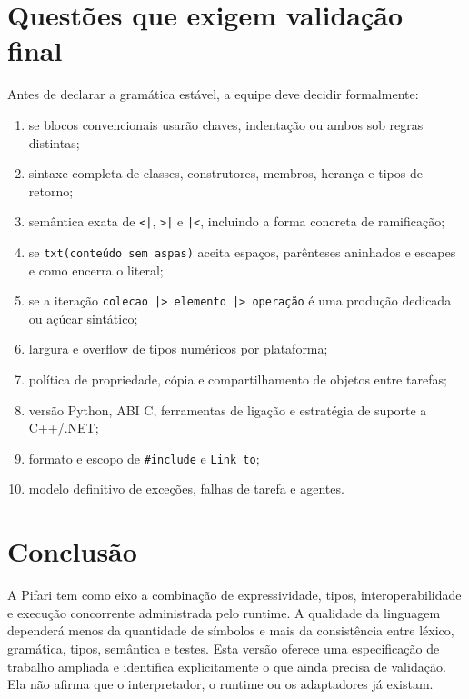 \documentclass[12pt,a4paper]{article}
\begin{document}
\section{Questões que exigem validação final}
Antes de declarar a gramática estável, a equipe deve decidir formalmente:
\begin{enumerate}
\item se blocos convencionais usarão chaves, indentação ou ambos sob regras distintas;
\item sintaxe completa de classes, construtores, membros, herança e tipos de retorno;
\item semântica exata de \texttt{<|}, \texttt{>|} e \texttt{|<}, incluindo a forma concreta de ramificação;
\item se \texttt{txt(conteúdo sem aspas)} aceita espaços, parênteses aninhados e escapes e como encerra o literal;
\item se a iteração \texttt{colecao |> elemento |> operação} é uma produção dedicada ou açúcar sintático;
\item largura e overflow de tipos numéricos por plataforma;
\item política de propriedade, cópia e compartilhamento de objetos entre tarefas;
\item versão Python, ABI C, ferramentas de ligação e estratégia de suporte a C++/.NET;
\item formato e escopo de \texttt{\#include} e \texttt{Link to};
\item modelo definitivo de exceções, falhas de tarefa e agentes.
\end{enumerate}
\section{Conclusão}
A Pifari tem como eixo a combinação de expressividade, tipos, interoperabilidade e execução concorrente administrada pelo runtime. A qualidade da linguagem dependerá menos da quantidade de símbolos e mais da consistência entre léxico, gramática, tipos, semântica e testes. Esta versão oferece uma especificação de trabalho ampliada e identifica explicitamente o que ainda precisa de validação. Ela não afirma que o interpretador, o runtime ou os adaptadores já existam.
\end{document}
